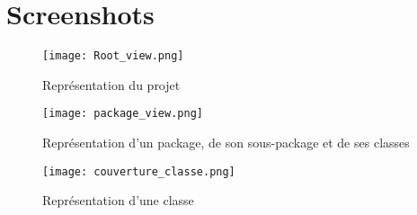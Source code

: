 \section{Screenshots}

\begin{figure}[h]
\texttt{[image: Root\_view.png]}
\caption{Représentation du projet}
\end{figure}

\begin{figure}[h]
\texttt{[image: package\_view.png]}
\caption{Représentation d'un package, de son sous-package et de ses classes}
\end{figure}

\begin{figure}[h]
\texttt{[image: couverture\_classe.png]}
\caption{Représentation d'une classe}
\end{figure}

